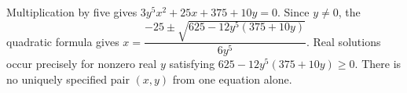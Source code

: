 Multiplication by five gives $3y^5x^2+25x+375+10y=0$. Since $y\ne0$, the quadratic formula gives $\boxed{x=\dfrac{-25\pm\sqrt{625-12y^5(375+10y)}}{6y^5}}$. Real solutions occur precisely for nonzero real $y$ satisfying $625-12y^5(375+10y)\ge0$. There is no uniquely specified pair $(x,y)$ from one equation alone.
